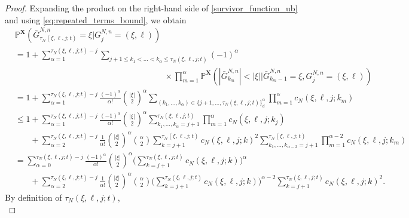 \documentclass[a4paper,11pt]{article}
\theoremstyle{definition}
\newcommand{\bbP}{\mathbb{P}}
\newcommand{\bfX}{\mathbf{X}}
\begin{document}
\begin{proof}
Expanding the product on the right-hand side of \eqref{survivor_function_ub} and using \eqref{eq:repeated_terms_bound}, we obtain
\begin{align*}
&\bbP^{ \bfX }(  \bar{ G }_{ \tau_N( \xi, \ell, j; t ) }^{ N, n } = \xi | G_j^{ N, n } = ( \xi, \ell ) )  \\
&= 1 + \sum_{ \alpha = 1 }^{ \tau_N( \xi, \ell, j; t ) - j } \sum_{ j + 1 \leq k_1 < \ldots < k_{ \alpha } \leq \tau_N( \xi, \ell, j; t ) } ( -1 )^{ \alpha } \\
&\phantom{= 1 + \sum_{ \alpha = 1 }^{ \tau_N( \xi, \ell, j; t ) - j } \sum_{ j + 1 \leq k_1 < \ldots < k_{ \alpha }}} \times  \prod_{ m = 1 }^{ \alpha } \bbP^{ \bfX }( | \bar{ G }_{ k_m }^{ N, n } | < | \xi | | \bar{ G }_{ k_m - 1 }^{ N, n } = \xi, G_j^{ N, n } = ( \xi, \ell ) ) \\
&= 1 + \sum_{ \alpha = 1 }^{ \tau_N( \xi, \ell, j; t ) - j } \frac{ ( -1 )^{ \alpha } }{ \alpha ! } \binom{ | \xi | }{ 2 }^{ \alpha } \sum_{ ( k_1, \ldots, k_{ \alpha } ) \in \{ j + 1, \ldots, \tau_N( \xi, \ell, j; t ) \}_d^{ \alpha } } \prod_{ m = 1 }^{ \alpha } c_N( \xi, \ell, j; k_m ) \\
&\leq 1 + \sum_{ \alpha = 1 }^{ \tau_N( \xi, \ell, j; t ) - j } \frac{ ( -1 )^{ \alpha } }{ \alpha ! } \binom{ | \xi | }{ 2 }^{ \alpha } \sum_{ k_1, \ldots, k_{ \alpha } = j + 1 }^{ \tau_N( \xi, \ell, j; t ) } \prod_{ m = 1 }^{ \alpha } c_N( \xi, \ell, j; k_j ) \\
&\phantom{\leq 1} + \sum_{ \alpha = 2 }^{ \tau_N( \xi, \ell, j; t ) - j } \frac{ 1 }{ \alpha ! } \binom{ | \xi | }{ 2 }^{ \alpha } \binom{ \alpha }{ 2 } \sum_{ k = j + 1 }^{ \tau_N( \xi, \ell, j; t ) } c_N( \xi, \ell, j; k )^2  \sum_{ k_1, \ldots, k_{ \alpha - 2 } = j + 1 }^{ \tau_N( \xi, \ell, j; t ) } \prod_{ m = 1 }^{ \alpha - 2 } c_N( \xi, \ell, j; k_m ) \\
&= \sum_{ \alpha = 0 }^{ \tau_N( \xi, \ell, j; t ) - j } \frac{ ( -1 )^{ \alpha } }{ \alpha ! } \binom{ | \xi | }{ 2 }^{ \alpha } \Bigg( \sum_{ k = j + 1 }^{ \tau_N( \xi, \ell, j; t ) } c_N( \xi, \ell, j; k ) \Bigg)^{ \alpha } \\
&\phantom{\leq 1}+ \sum_{ \alpha = 2 }^{ \tau_N( \xi, \ell, j; t ) - j } \frac{ 1 }{ \alpha ! } \binom{ | \xi | }{ 2 }^{ \alpha } \binom{ \alpha }{ 2 } \Bigg( \sum_{ k = j + 1 }^{ \tau_N( \xi, \ell, j; t ) } c_N( \xi, \ell, j; k ) \Bigg)^{ \alpha - 2 } \sum_{ k = j + 1 }^{ \tau_N( \xi, \ell, j; t ) } c_N( \xi, \ell, j; k )^2.
\end{align*}
By definition of $\tau_N( \xi, \ell, j; t )$,
\begin{equation}\label{generalised_inverse_sandwich}

\end{equation}
\end{proof}
\end{document}
